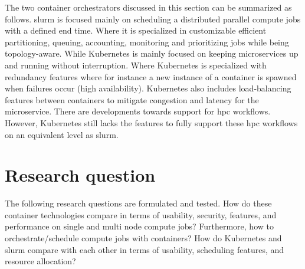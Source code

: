 \documentclass[12pt]{article}
\begin{document}
The two container orchestrators discussed in this section can be summarized as follows. \gls{slurm} is focused mainly on scheduling a distributed parallel compute jobs with a defined end time. Where it is specialized in customizable efficient partitioning, queuing, accounting, monitoring and prioritizing jobs while being topology-aware. While Kubernetes is mainly focused on keeping microservices up and running without interruption. Where Kubernetes is specialized with redundancy features where for instance a new instance of a container is spawned when failures occur (high availability). Kubernetes also includes load-balancing features between containers to mitigate congestion and latency for the microservice. There are developments towards support for \gls{hpc} workflows. However, Kubernetes still lacks the features to fully support these \gls{hpc} workflows on an equivalent level as \gls{slurm}.


\section{Research question}
\label{research-question}
The following research questions are formulated and tested. How do these container technologies compare in terms of usability, security, features, and performance on single and multi node compute jobs? Furthermore, how to orchestrate/schedule compute jobs with containers? How do Kubernetes and \gls{slurm} compare with each other in terms of usability, scheduling features, and resource allocation?


\end{document}

